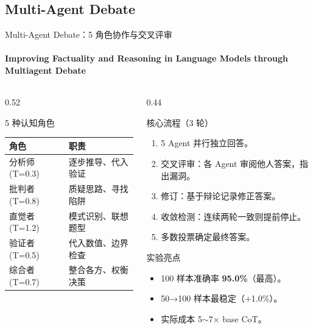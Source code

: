 \documentclass[10pt,aspectratio=169]{beamer}
\newcommand{\tightitems}{\setlength{\itemsep}{0.24em}}
\begin{document}
\subsection{Multi-Agent Debate}

\begin{frame}{Multi-Agent Debate：5 角色协作与交叉评审}
  \framesubtitle{Improving Factuality and Reasoning in Language Models through Multiagent Debate}
  \small
  \begin{columns}[T,onlytextwidth]
    \begin{column}{0.52\textwidth}
      \begin{block}{5 种认知角色}
        \begin{tabular}{ll}
          \toprule
          角色 & 职责 \\
          \midrule
          分析师 (T=0.3) & 逐步推导、代入验证 \\
          批判者 (T=0.8) & 质疑思路、寻找陷阱 \\
          直觉者 (T=1.2) & 模式识别、联想题型 \\
          验证者 (T=0.5) & 代入数值、边界检查 \\
          综合者 (T=0.7) & 整合各方、权衡决策 \\
          \bottomrule
        \end{tabular}
      \end{block}
    \end{column}
    \begin{column}{0.44\textwidth}
      \begin{block}{核心流程（3 轮）}
        \begin{enumerate}
          \tightitems
          \item 5 Agent 并行独立回答。
          \item 交叉评审：各 Agent 审阅他人答案，指出漏洞。
          \item 修订：基于辩论记录修正答案。
          \item 收敛检测：连续两轮一致则提前停止。
          \item 多数投票确定最终答案。
        \end{enumerate}
      \end{block}
      \begin{alertblock}{实验亮点}
        \begin{itemize}
          \tightitems
          \item 100 样本准确率 \textbf{95.0\%}（最高）。
          \item 50→100 样本最稳定（+1.0\%）。
          \item 实际成本 5$\sim$7× base CoT。
        \end{itemize}
      \end{alertblock}
    \end{column}
  \end{columns}
\end{frame}
\end{document}

